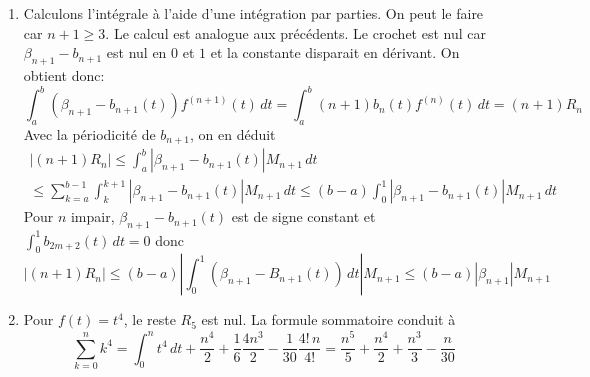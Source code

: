 \begin{enumerate}
 \item 
 Calculons l'intégrale à l'aide d'une intégration par parties. On peut le faire car $n+1\geq3$. Le calcul est analogue aux précédents. Le crochet est nul car $\beta_{n+1} - b_{n+1}$ est nul en $0$ et $1$ et la constante disparait en dérivant. On obtient donc:
\begin{displaymath}
 \int_a^b\left(\beta_{n+1} - b_{n+1}(t) \right)f^{(n+1)}(t)\,dt=
  \int_a^b (n+1)b_{n}(t)f^{(n)}(t)\,dt = (n+1)R_n
\end{displaymath}
Avec la périodicité de $b_{n+1}$, on en déduit 
\begin{multline*}
 |(n+1)R_n|
\leq \int_a^b\left|\beta_{n+1} - b_{n+1}(t)\right|M_{n+1}\,dt \\
\leq \sum_{k=a}^{b-1}\int_k^{k+1}\left|\beta_{n+1} - b_{n+1}(t)\right|M_{n+1}\,dt 
\leq (b-a)\int_0^{1}\left|\beta_{n+1} - b_{n+1}(t)\right|M_{n+1}\,dt
\end{multline*}
Pour $n$ impair, $\beta_{n+1} - b_{n+1}(t)$ est de signe constant et $\int_0^1 b_{2m+2}(t)\,dt=0$ donc
\begin{displaymath}
|(n+1)R_n| \leq (b-a)\left|\int_0^1\left( \beta_{n+1} - B_{n+1}(t)\right) \,dt \right| M_{n+1} 
\leq (b-a)|\beta_{n+1}| M_{n+1}  
\end{displaymath}

 \item Pour $f(t)=t^4$, le reste $R_5$ est nul. La formule sommatoire conduit à
 \begin{displaymath}
\sum_{k=0}^{n}k^4 = \int_{0}^{n}t^4\,dt  + \frac{n^4}{2} + \frac{1}{6}\frac{4n^3}{2} -\frac{1}{30}\frac{4!\, n}{4!}
= \frac{n^5}{5} + \frac{n^4}{2} + \frac{n^3}{3} - \frac{n}{30}
 \end{displaymath}

\end{enumerate}